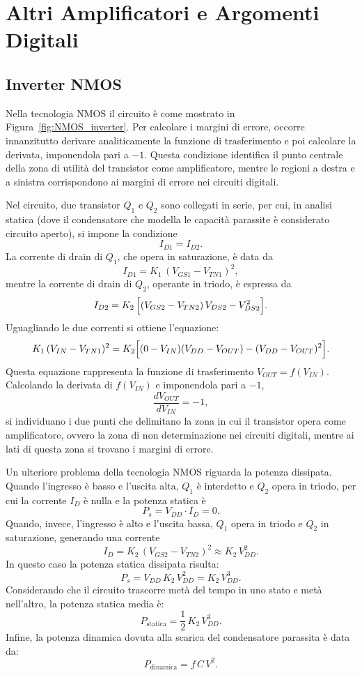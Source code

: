 \newpage
\section{Altri Amplificatori e Argomenti Digitali}

\subsection{Inverter NMOS}
Nella tecnologia NMOS il circuito è come mostrato in Figura~\ref{fig:NMOS_inverter}. Per calcolare i margini di errore, occorre innanzitutto derivare analiticamente la funzione di trasferimento e poi calcolare la derivata, imponendola pari a \(-1\). Questa condizione identifica il punto centrale della zona di utilità del transistor come amplificatore, mentre le regioni a destra e a sinistra corrispondono ai margini di errore nei circuiti digitali.

Nel circuito, due transistor \(Q_1\) e \(Q_2\) sono collegati in serie, per cui, in analisi statica (dove il condensatore che modella le capacità parassite è considerato circuito aperto), si impone la condizione
\[
I_{D1} = I_{D2}.
\]
La corrente di drain di \(Q_1\), che opera in saturazione, è data da
\[
I_{D1} = K_1\,(V_{GS1} - V_{TN1})^2,
\]
mentre la corrente di drain di \(Q_2\), operante in triodo, è espressa da
\[
I_{D2} = K_2\,\Bigl[(V_{GS2} - V_{TN2})\,V_{DS2} - V_{DS2}^2\Bigr].
\]
Uguagliando le due correnti si ottiene l'equazione:
\[
K_1\,(V_{IN} - V_{TN1})^2 = K_2\Bigl[(0 - V_{IN})(V_{DD}-V_{OUT}) - (V_{DD}-V_{OUT})^2\Bigr].
\]
Questa equazione rappresenta la funzione di trasferimento \(V_{OUT}=f(V_{IN})\). Calcolando la derivata di \(f(V_{IN})\) e imponendola pari a \(-1\),
\[
\frac{dV_{OUT}}{dV_{IN}} = -1,
\]
si individuano i due punti che delimitano la zona in cui il transistor opera come amplificatore, ovvero la zona di non determinazione nei circuiti digitali, mentre ai lati di questa zona si trovano i margini di errore.

Un ulteriore problema della tecnologia NMOS riguarda la potenza dissipata. Quando l’ingresso è basso e l’uscita alta, \(Q_1\) è interdetto e \(Q_2\) opera in triodo, per cui la corrente \(I_D\) è nulla e la potenza statica è
\[
P_s = V_{DD}\cdot I_D = 0.
\]
Quando, invece, l’ingresso è alto e l’uscita bassa, \(Q_1\) opera in triodo e \(Q_2\) in saturazione, generando una corrente
\[
I_D = K_2\,(V_{GS2} - V_{TN2})^2 \approx K_2\,V_{DD}^2.
\]
In questo caso la potenza statica dissipata risulta:
\[
P_s = V_{DD}\,K_2\,V_{DD}^2 = K_2\,V_{DD}^3.
\]
Considerando che il circuito trascorre metà del tempo in uno stato e metà nell'altro, la potenza statica media è:
\[
P_{\text{statica}} = \frac{1}{2}\,K_2\,V_{DD}^3.
\]
Infine, la potenza dinamica dovuta alla scarica del condensatore parassita è data da:
\[
P_{\text{dinamica}} = f\,C\,V^2.
\]

